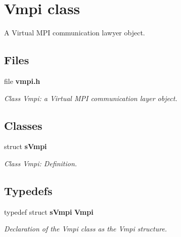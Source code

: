 \section{Vmpi class}
\label{a00026}


A Virtual M\-P\-I communication lawyer object.  


\subsection*{Files}
\begin{DoxyCompactItemize}
\item 
file {\bf vmpi.\-h}
\begin{DoxyCompactList}\small\item\em Class Vmpi\-: a Virtual M\-P\-I communication layer object. \end{DoxyCompactList}\end{DoxyCompactItemize}
\subsection*{Classes}
\begin{DoxyCompactItemize}
\item 
struct {\bf s\-Vmpi}
\begin{DoxyCompactList}\small\item\em Class Vmpi\-: Definition. \end{DoxyCompactList}\end{DoxyCompactItemize}
\subsection*{Typedefs}
\begin{DoxyCompactItemize}
\item 
typedef struct {\bf s\-Vmpi} {\bf Vmpi}
\begin{DoxyCompactList}\small\item\em Declaration of the Vmpi class as the Vmpi structure. \end{DoxyCompactList}\end{DoxyCompactItemize}
